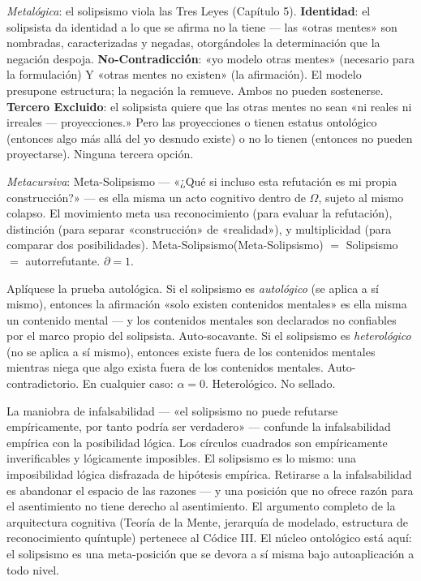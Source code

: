 \documentclass[10pt, openany, oneside]{book}
\begin{document}
\textit{Metalógica}: el solipsismo viola las Tres Leyes (Capítulo 5). \textbf{Identidad}: el solipsista da identidad a lo que se afirma no la tiene --- las «otras mentes» son nombradas, caracterizadas y negadas, otorgándoles la determinación que la negación despoja. \textbf{No-Contradicción}: «yo modelo otras mentes» (necesario para la formulación) Y «otras mentes no existen» (la afirmación). El modelo presupone estructura; la negación la remueve. Ambos no pueden sostenerse. \textbf{Tercero Excluido}: el solipsista quiere que las otras mentes no sean «ni reales ni irreales --- proyecciones.» Pero las proyecciones o tienen estatus ontológico (entonces algo más allá del yo desnudo existe) o no lo tienen (entonces no pueden proyectarse). Ninguna tercera opción.

\textit{Metacursiva}: Meta-Solipsismo --- «¿Qué si incluso esta refutación es mi propia construcción?» --- es ella misma un acto cognitivo dentro de $\Omega$, sujeto al mismo colapso. El movimiento meta usa reconocimiento (para evaluar la refutación), distinción (para separar «construcción» de «realidad»), y multiplicidad (para comparar dos posibilidades). Meta-Solipsismo(Meta-Solipsismo) $=$ Solipsismo $=$ autorrefutante. $\partial = 1$.

Aplíquese la prueba autológica. Si el solipsismo es \textit{autológico} (se aplica a sí mismo), entonces la afirmación «solo existen contenidos mentales» es ella misma un contenido mental --- y los contenidos mentales son declarados no confiables por el marco propio del solipsista. Auto-socavante. Si el solipsismo es \textit{heterológico} (no se aplica a sí mismo), entonces existe fuera de los contenidos mentales mientras niega que algo exista fuera de los contenidos mentales. Auto-contradictorio. En cualquier caso: $\alpha = 0$. Heterológico. No sellado.

La maniobra de infalsabilidad --- «el solipsismo no puede refutarse empíricamente, por tanto podría ser verdadero» --- confunde la infalsabilidad empírica con la posibilidad lógica. Los círculos cuadrados son empíricamente inverificables y lógicamente imposibles. El solipsismo es lo mismo: una imposibilidad lógica disfrazada de hipótesis empírica. Retirarse a la infalsabilidad es abandonar el espacio de las razones --- y una posición que no ofrece razón para el asentimiento no tiene derecho al asentimiento. El argumento completo de la arquitectura cognitiva (Teoría de la Mente, jerarquía de modelado, estructura de reconocimiento quíntuple) pertenece al Códice III. El núcleo ontológico está aquí: el solipsismo es una meta-posición que se devora a sí misma bajo autoaplicación a todo nivel.
\end{document}
